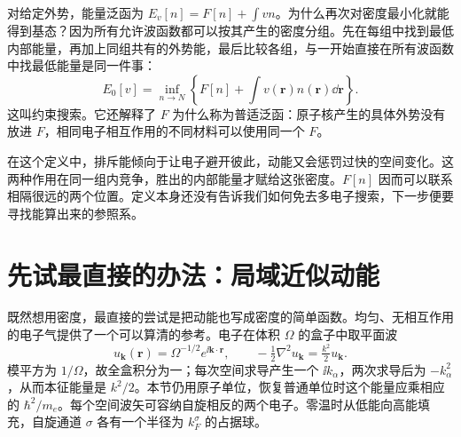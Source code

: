 对给定外势，能量泛函为 $E_v[n]=F[n]+\int vn$。为什么再次对密度最小化就能得到基态？因为所有允许波函数都可以按其产生的密度分组。先在每组中找到最低内部能量，再加上同组共有的外势能，最后比较各组，与一开始直接在所有波函数中找最低能量是同一件事：
\begin{equation}
E_0[v]=\inf_{n\to N}\left\{F[n]+\int v(\bm r)n(\bm r)\dd\bm r\right\}.
\end{equation}
这叫约束搜索。它还解释了 $F$ 为什么称为普适泛函：原子核产生的具体外势没有放进 $F$，相同电子相互作用的不同材料可以使用同一个 $F$。

在这个定义中，排斥能倾向于让电子避开彼此，动能又会惩罚过快的空间变化。这两种作用在同一组内竞争，胜出的内部能量才赋给这张密度。$F[n]$ 因而可以联系相隔很远的两个位置。定义本身还没有告诉我们如何免去多电子搜索，下一步便要寻找能算出来的参照系。

\section{先试最直接的办法：局域近似动能}
既然想用密度，最直接的尝试是把动能也写成密度的简单函数。均匀、无相互作用的电子气提供了一个可以算清的参考。电子在体积 $\Omega$ 的盒子中取平面波
\begin{equation}
u_{\bm k}(\bm r)=\Omega^{-1/2}e^{\ii\bm k\cdot\bm r},\qquad
-\tfrac12\nabla^2u_{\bm k}=\tfrac{k^2}{2}u_{\bm k}.
\end{equation}
模平方为 $1/\Omega$，故全盒积分为一；每次空间求导产生一个 $\ii k_\alpha$，两次求导后为 $-k_\alpha^2$，从而本征能量是 $k^2/2$。本节仍用原子单位，恢复普通单位时这个能量应乘相应的 $\hbar^2/m_e$。每个空间波矢可容纳自旋相反的两个电子。零温时从低能向高能填充，自旋通道 $\sigma$ 各有一个半径为 $k_F^\sigma$ 的占据球。

